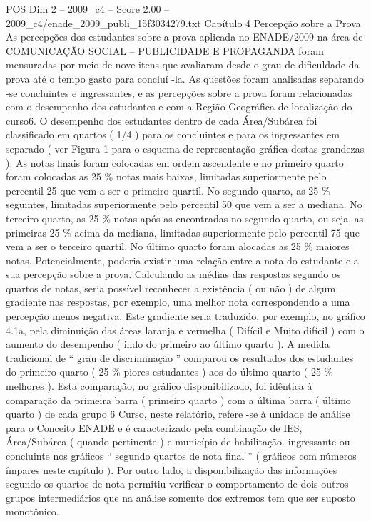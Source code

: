 \begin{textsample}{POS Dim 2 – 2009\_c4 – Score 2.00 – 2009\_c4/enade\_2009\_publi\_15f3034279.txt}  \label{ex:f2_pos_200}
Capítulo 4 Percepção sobre a Prova As percepções dos estudantes sobre a prova aplicada no ENADE/2009 na área de COMUNICAÇÃO SOCIAL – PUBLICIDADE E PROPAGANDA foram mensuradas por meio de nove itens que avaliaram desde o grau de dificuldade da prova até o tempo gasto para concluí -la.
As questões foram analisadas separando -se concluintes e ingressantes, e as percepções sobre a prova foram relacionadas com o desempenho dos estudantes e com a Região Geográfica de localização do curso6.
O desempenho dos estudantes dentro de cada Área/Subárea foi classificado em quartos ( 1/4 ) para os concluintes e para os ingressantes em separado ( ver Figura 1 para o esquema de representação gráfica destas grandezas ).
As notas finais foram colocadas em ordem ascendente e no primeiro quarto foram colocadas as 25 \% notas mais baixas, limitadas superiormente pelo percentil 25 que vem a ser o primeiro quartil.
No segundo quarto, as 25 \% seguintes, limitadas superiormente pelo percentil 50 que vem a ser a mediana.
No terceiro quarto, as 25 \% notas após as encontradas no segundo quarto, ou seja, as primeiras 25 \% acima da mediana, limitadas superiormente pelo percentil 75 que vem a ser o terceiro quartil.
No último quarto foram alocadas as 25 \% maiores notas.
Potencialmente, poderia existir uma relação entre a nota do estudante e a sua percepção sobre a prova.
Calculando as médias das respostas segundo os quartos de notas, seria possível reconhecer a existência ( ou não ) de algum gradiente nas respostas, por exemplo, uma melhor nota correspondendo a uma percepção menos negativa.
Este gradiente seria traduzido, por exemplo, no gráfico 4.1a, pela diminuição das áreas laranja e vermelha ( Difícil e Muito difícil ) com o aumento do desempenho ( indo do primeiro ao último quarto ).
A medida tradicional de “ grau de discriminação ” comparou os resultados dos estudantes do primeiro quarto ( 25 \% piores estudantes ) aos do último quarto ( 25 \% melhores ).
Esta comparação, no gráfico disponibilizado, foi idêntica à comparação da primeira barra ( primeiro quarto ) com a última barra ( último quarto ) de cada grupo 6 Curso, neste relatório, refere -se à unidade de análise para o Conceito ENADE e é caracterizado pela combinação de IES, Área/Subárea ( quando pertinente ) e município de habilitação. ingressante ou concluinte nos gráficos “ segundo quartos de nota final ” ( gráficos com números ímpares neste capítulo ).
Por outro lado, a disponibilização das informações segundo os quartos de nota permitiu verificar o comportamento de dois outros grupos intermediários que na análise somente dos extremos tem que ser suposto monotônico.

\end{textsample}
